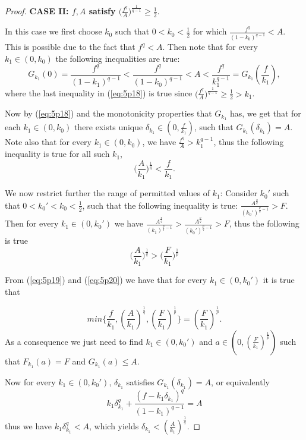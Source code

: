 \documentclass{article}
\numberwithin{equation}{section}
\theoremstyle{definition}
\theoremstyle{remark}
\begin{document}
\begin{proof}
{\bf{CASE II}: $f,A$ satisfy $\big(\frac{f^q}{A}\big)^{\frac{1}{q-1}}\geq\frac{1}{2}$}.

In this case we first choose $k_0$ such that $0<k_0<\frac{1}{2}$ for which $\frac{f^q}{(1-k_0)^{q-1}}<A$. This is possible due to the fact that $f^q<A$. Then note that for every $k_1\in (0,k_0)$ the following inequalities are true:
\begin{equation}\label{eq:5p18}
G_{k_1}(0)=\frac{f^q}{(1-k_1)^{q-1}}<\frac{f^q}{(1-k_0)^{q-1}}<A<\frac{f^q}{k_1^{q-1}}=G_{k_1}(\frac{f}{k_1}),
\end{equation}
where the last inequality in (\ref{eq:5p18}) is true since $\big(\frac{f^q}{A}\big)^{\frac{1}{q-1}}\geq\frac{1}{2}>k_1$.

Now by (\ref{eq:5p18}) and the monotonicity properties that $G_{k_1}$ has, we get that for each $k_1\in (0,k_0)$ there exists unique $\delta_{k_1} \in (0,\frac{f}{k_1})$, such that $G_{k_1}(\delta_{k_1})=A$.
Note also that for every $k_1\in (0,k_0)$, we have $\frac{f^q}{A}>k_1^{q-1}$, thus the following inequality is true for all such $k_1$,
\begin{equation}\label{eq:5p19} 
\big(\frac{A}{k_1}\big)^{\frac{1}{q}}<\frac{f}{k_1}.
\end{equation}

We now restrict further the range of permitted values of $k_1$: Consider $k_0'$ such that $0<k_0'<k_0<\frac{1}{2}$, such that the following inequality is true: $\frac{A^{\frac{p}{q}}}{(k_0')^{\frac{p}{q}-1}}>F$. Then for every $k_1\in (0,k_0')$ we have
 $\frac{A^{\frac{p}{q}}}{(k_1)^{\frac{p}{q}-1}}>\frac{A^{\frac{p}{q}}}{(k_0')^{\frac{p}{q}-1}}>F$, thus the following is true
\begin{equation}\label{eq:5p20} 
\big(\frac{A}{k_1}\big)^{\frac{1}{q}}>\big(\frac{F}{k_1}\big)^{\frac{1}{p}}
\end{equation}

From (\ref{eq:5p19}) and (\ref{eq:5p20}) we have that for every $k_1\in (0,k_0')$ it is true that

$$min\{ \frac{f}{k_1},(\frac{A}{k_1})^{\frac{1}{q}}, (\frac{F}{k_1})^{\frac{1}{p}} \}=(\frac{F}{k_1})^{\frac{1}{p}}.$$
As a consequence we just need to find $k_1\in (0,k_0')$ and 
$a\in (0,(\frac{F}{k_1})^{\frac{1}{p}})$ such that $F_{k_1}(a)=F$ and 
$G_{k_1}(a)\leq A$. 

Now for every $k_1\in (0,k_0')$, $\delta_{k_1}$ satisfies $G_{k_1}(\delta_{k_1})=A$, or equivalently  
\begin{equation}\label{eq:5p21}
k_1\delta_{k_1}^q+\frac{(f-k_1\delta_{k_1})^q}{(1-k_1)^{q-1}}=A
\end{equation}
thus we have $k_1\delta_{k_1}^q<A$, which yields $\delta_{k_1}<(\frac{A}{k_1})^{\frac{1}{q}}$. 


\end{proof}
\end{document}
